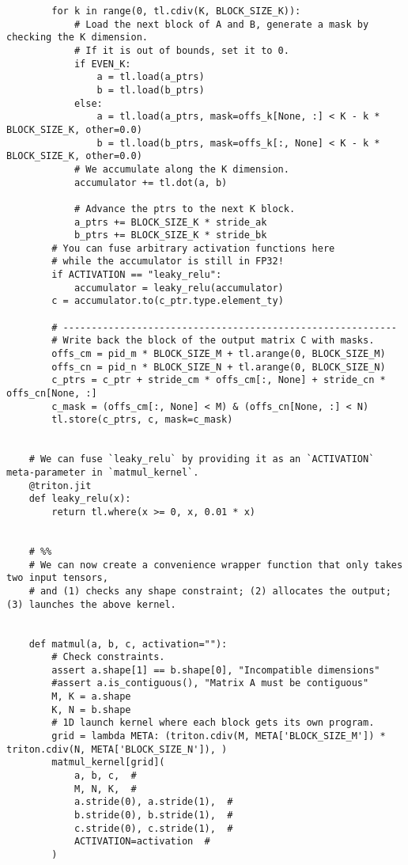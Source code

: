 \documentclass{article}
\begin{document}
\begin{lstlisting}
        for k in range(0, tl.cdiv(K, BLOCK_SIZE_K)):
            # Load the next block of A and B, generate a mask by checking the K dimension.
            # If it is out of bounds, set it to 0.
            if EVEN_K:
                a = tl.load(a_ptrs)
                b = tl.load(b_ptrs)
            else:
                a = tl.load(a_ptrs, mask=offs_k[None, :] < K - k * BLOCK_SIZE_K, other=0.0)
                b = tl.load(b_ptrs, mask=offs_k[:, None] < K - k * BLOCK_SIZE_K, other=0.0)
            # We accumulate along the K dimension.
            accumulator += tl.dot(a, b)

            # Advance the ptrs to the next K block.
            a_ptrs += BLOCK_SIZE_K * stride_ak
            b_ptrs += BLOCK_SIZE_K * stride_bk
        # You can fuse arbitrary activation functions here
        # while the accumulator is still in FP32!
        if ACTIVATION == "leaky_relu":
            accumulator = leaky_relu(accumulator)
        c = accumulator.to(c_ptr.type.element_ty)

        # -----------------------------------------------------------
        # Write back the block of the output matrix C with masks.
        offs_cm = pid_m * BLOCK_SIZE_M + tl.arange(0, BLOCK_SIZE_M)
        offs_cn = pid_n * BLOCK_SIZE_N + tl.arange(0, BLOCK_SIZE_N)
        c_ptrs = c_ptr + stride_cm * offs_cm[:, None] + stride_cn * offs_cn[None, :]
        c_mask = (offs_cm[:, None] < M) & (offs_cn[None, :] < N)
        tl.store(c_ptrs, c, mask=c_mask)


    # We can fuse `leaky_relu` by providing it as an `ACTIVATION` meta-parameter in `matmul_kernel`.
    @triton.jit
    def leaky_relu(x):
        return tl.where(x >= 0, x, 0.01 * x)


    # %%
    # We can now create a convenience wrapper function that only takes two input tensors,
    # and (1) checks any shape constraint; (2) allocates the output; (3) launches the above kernel.


    def matmul(a, b, c, activation=""):
        # Check constraints.
        assert a.shape[1] == b.shape[0], "Incompatible dimensions"
        #assert a.is_contiguous(), "Matrix A must be contiguous"
        M, K = a.shape
        K, N = b.shape
        # 1D launch kernel where each block gets its own program.
        grid = lambda META: (triton.cdiv(M, META['BLOCK_SIZE_M']) * triton.cdiv(N, META['BLOCK_SIZE_N']), )
        matmul_kernel[grid](
            a, b, c,  #
            M, N, K,  #
            a.stride(0), a.stride(1),  #
            b.stride(0), b.stride(1),  #
            c.stride(0), c.stride(1),  #
            ACTIVATION=activation  #
        )



\end{lstlisting}
\end{document}
